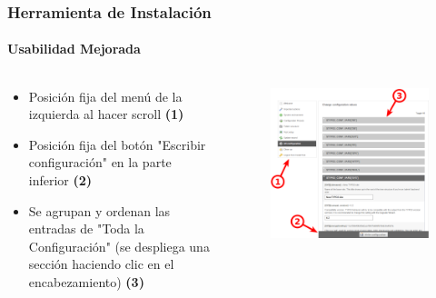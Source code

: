 
\begin{frame}[fragile]
	\frametitle{Herramienta de Instalación}
	\framesubtitle{Usabilidad Mejorada}

	\begin{columns}[T]
		\begin{column}{.5\textwidth}

			\begin{itemize}
				\item Posición fija del menú de la izquierda al hacer scroll
					\begingroup\color{typo3red}\textbf{(1)}\endgroup
				\item Posición fija del botón "Escribir configuración" en la parte inferior
					\begingroup\color{typo3red}\textbf{(2)}\endgroup
				\item Se agrupan y ordenan las entradas de "Toda la Configuración" (se despliega una sección haciendo clic en el encabezamiento)
					\begingroup\color{typo3red}\textbf{(3)}\endgroup
			\end{itemize}

		\end{column}
		\begin{column}{.5\textwidth}

			\begin{figure}\vspace*{-0.4cm}
				\includegraphics[width=0.8\linewidth]{Images/InstallTool/ImprovedUsability.png}
			\end{figure}

		\end{column}
	\end{columns}

\end{frame}

